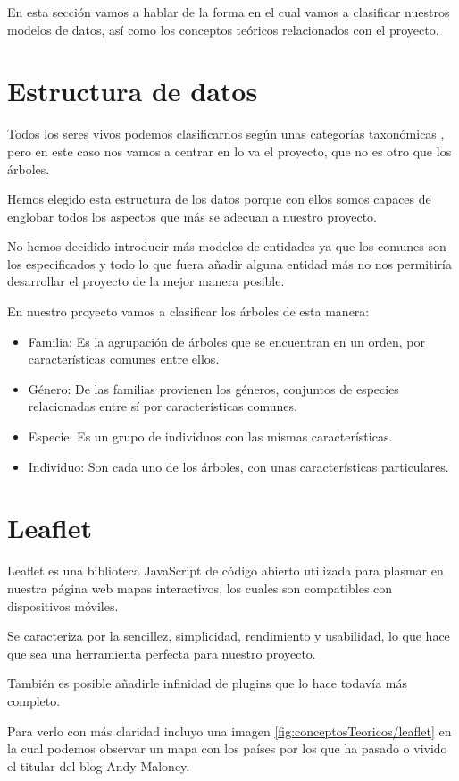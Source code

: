
En esta sección vamos a hablar de la forma en el cual vamos a clasificar nuestros modelos de datos, así como los conceptos teóricos relacionados con el proyecto.

\section{Estructura de datos}

Todos los seres vivos podemos clasificarnos según unas categorías taxonómicas \cite{CategoriaTaxonomica}, pero en este caso nos vamos a centrar en lo va el proyecto, que no es otro que los árboles.

Hemos elegido esta estructura de los datos porque con ellos somos capaces de englobar todos los aspectos que más se adecuan a nuestro proyecto.

No hemos decidido introducir más modelos de entidades ya que los comunes son los especificados y todo lo que fuera añadir alguna entidad más no nos permitiría desarrollar el proyecto de la mejor manera posible.

En nuestro proyecto vamos a clasificar los árboles de esta manera:
\begin{itemize}
	\item Familia: Es la agrupación de árboles que se encuentran en un orden, por características comunes entre ellos.
	\item Género: De las familias provienen los géneros, conjuntos de especies relacionadas entre sí por características comunes.
	\item Especie: Es un grupo de individuos con las mismas características.
	\item Individuo: Son cada uno de los árboles, con unas características particulares.
\end{itemize}

\section{Leaflet}

Leaflet \cite{leaflet} es una biblioteca JavaScript de código abierto utilizada para plasmar en nuestra página web mapas interactivos, los cuales son compatibles con dispositivos móviles.

Se caracteriza por la sencillez, simplicidad, rendimiento y usabilidad, lo que hace que sea una herramienta perfecta para nuestro proyecto.

También es posible añadirle infinidad de plugins que lo hace todavía más completo.

Para verlo con más claridad incluyo una imagen \ref{fig:conceptosTeoricos/leaflet} en la cual podemos observar un mapa con los países por los que ha pasado o vivido el titular del blog Andy Maloney.


